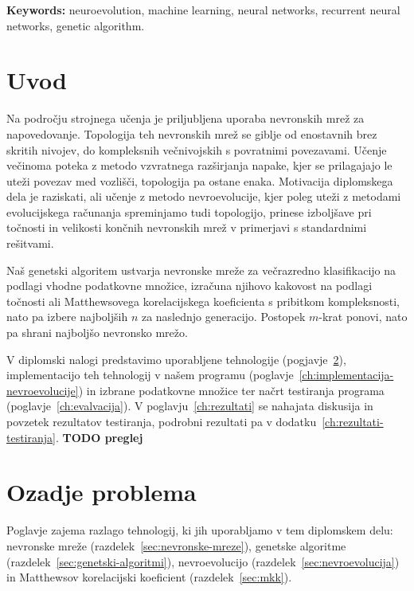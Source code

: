\documentclass[a4paper,12pt,openright]{book}
\newcommand{\tkeywordsEn}{neuroevolution, machine learning, neural networks, recurrent neural networks, genetic algorithm}
\newcommand{\clearemptydoublepage}{\newpage{\pagestyle{empty}\cleardoublepage}}
\begin{document}
    \noindent\textbf{Keywords:} \tkeywordsEn.
    \clearemptydoublepage

    \mainmatter
    \setcounter{page}{1}
    \pagestyle{fancy}

    \chapter{Uvod}\label{ch:uvod}
    Na področju strojnega učenja je priljubljena uporaba nevronskih mrež za napovedovanje.
    Topologija teh nevronskih mrež se giblje od enostavnih brez skritih nivojev, do kompleksnih večnivojskih
    s povratnimi povezavami.
    Učenje večinoma poteka z metodo vzvratnega razširjanja napake, kjer se prilagajajo le uteži povezav med vozlišči,
    topologija pa ostane enaka.
    Motivacija diplomskega dela je raziskati, ali učenje z metodo nevroevolucije, kjer poleg uteži z metodami evolucijskega
    računanja spreminjamo tudi topologijo, prinese izboljšave pri točnosti in velikosti končnih nevronskih
    mrež v primerjavi s standardnimi rešitvami.

    Naš genetski algoritem ustvarja nevronske mreže za večrazredno klasifikacijo na podlagi vhodne
    podatkovne množice, izračuna njihovo kakovost na podlagi toč\-no\-sti ali Matthewsovega korelacijskega koeficienta s pribitkom kompleksnosti,
    nato pa izbere najboljših $n$ za naslednjo generacijo.
    Postopek $m$-krat ponovi, nato pa shrani najboljšo nevronsko mrežo.

    V diplomski nalogi predstavimo uporabljene tehnologije (pogjavje~\ref{ch:ozadje-problema}), implementacijo teh
    tehnologij v našem programu (poglavje~\ref{ch:implementacija-nevroevolucije}) in izbrane podatkovne množice ter
    načrt testiranja programa (poglavje~\ref{ch:evalvacija}).
    V poglavju~\ref{ch:rezultati} se nahajata diskusija in povzetek rezultatov testiranja, podrobni rezultati pa v dodatku~\ref{ch:rezultati-testiranja}.
    \textbf{TODO preglej}


    \chapter{Ozadje problema}\label{ch:ozadje-problema}
    Poglavje zajema razlago tehnologij, ki jih uporabljamo v tem diplomskem delu: nevronske mreže (razdelek~\ref{sec:nevronske-mreze}),
    genetske algoritme (razdelek~\ref{sec:genetski-algoritmi}), nevroevolucijo (razdelek~\ref{sec:nevroevolucija}) in
    Matthewsov korelacijski koeficient (razdelek~\ref{sec:mkk}).
\end{document}
